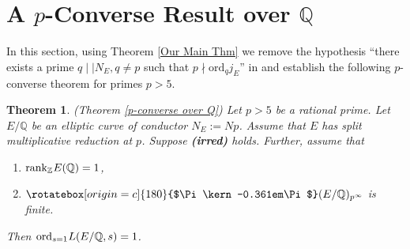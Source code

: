 \documentclass[reqno,10pt]{amsart}
\newcommand{\q}{\mathbb{Q}}
\newcommand{\z}{\mathbb{Z}}
\newcommand{\Varpi}{\rotatebox[origin=c]{180}{$\Pi\kern-0.361em\Pi$}}
\theoremstyle{plain}
\newtheorem{thm}{Theorem}[section]
\theoremstyle{definition}
\begin{document}
\section{A $p$-Converse Result over $\q$} \label{p converse over Q}
In this section, using Theorem \ref{Our Main Thm} we remove the hypothesis ``there exists a prime $q \mid\mid N_E, q \neq p$ such that $p \nmid \mathrm{ord}_q j_E$'' in \cite[Theorem A]{Rodolfo} and establish the following $p$-converse theorem for primes $p > 5$.

\begin{thm} (Theorem \ref{p-converse over Q}) \label{proof over Q}
    Let $p > 5$ be a rational prime. Let $E/\q$ be an elliptic curve of conductor $N_E := Np$. Assume that $E$ has split multiplicative reduction at $p$. Suppose \textbf{(irred)} holds. Further, assume that
    \begin{enumerate}
        \item $\mathrm{rank}_\z \hspace{0.1mm} E(\q) = 1$,
        \item $\Varpi(E/\q)_{p^\infty}$ is finite.
    \end{enumerate}
    Then $\mathrm{ord}_{s=1} \hspace{0.1mm} L(E/\q,s) = 1$.
\end{thm}
\end{document}
